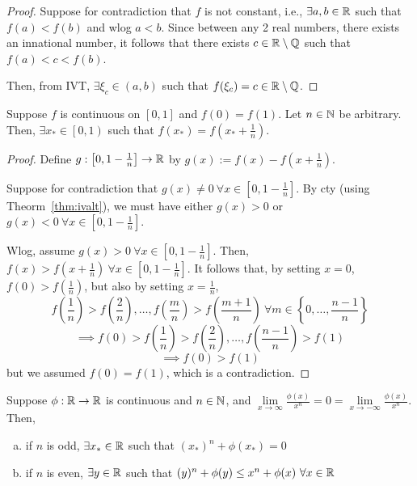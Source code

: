 \begin{proof}
    Suppose for contradiction that $f$ is not constant, i.e., $\exists a, b \in \mathbb R$ such that $f(a) < f(b)$ and wlog $a < b$.
    Since between any 2 real numbers, there exists an innational number, it follows that there exists $c \in \mathbb R \setminus \mathbb Q$ such that $f(a) < c < f(b)$.

    Then, from IVT, $\exists \xi_c \in (a, b)$ such that $f(\xi_c) = c \in \mathbb R \setminus \mathbb Q$.
\end{proof}

\begin{example}
    Suppose $f$ is continuous on $\left[0, 1\right]$ and $f(0) = f(1)$. Let $n \in \mathbb N$ be arbitrary.
    Then, $\exists x_* \in \left[0, 1\right)$ such that $f(x_*) = f\left(x_* + \frac{1}{n}\right)$. 
\end{example}

\begin{proof}
    Define $g: \left[0, 1 - \frac{1}{n}\right] \to \mathbb R$ by $g(x) := f(x) - f\left(x + \frac{1}{n}\right)$.

    Suppose for contradiction that $g(x) \neq 0\ \forall x \in \left[0, 1 - \frac{1}{n}\right]$.
    By cty (using Theorm~\ref{thm:ivalt}), we must have either $g(x) > 0$ or $g(x) < 0\ \forall x \in \left[0, 1 - \frac{1}{n}\right]$.

    Wlog, assume $g(x) > 0\ \forall x \in \left[0, 1 - \frac{1}{n}\right]$.
    Then, $f(x) > f\left(x + \frac{1}{n}\right)\ \forall x \in \left[0, 1 - \frac{1}{n}\right]$.
    It follows that, by setting $x=0$, $f(0) > f\left(\frac{1}{n}\right)$, but also by setting $x = \frac{1}{n}$,
    $$f\left(\frac{1}{n}\right) > f\left(\frac{2}{n}\right), \ldots, f\left(\frac{m}{n}\right) > f\left(\frac{m + 1}{n}\right)\ \forall m \in \left\{0, \ldots, \frac{n-1}{n}\right\}$$
    $$\implies f(0) > f\left(\frac{1}{n}\right) > f\left(\frac{2}{n}\right), \ldots, f\left(\frac{n-1}{n}\right) > f\left(1\right)$$
    $$\implies f(0) > f(1)$$
    but we assumed $f(0) = f(1)$, which is a contradiction.
\end{proof}

\begin{example}
    Suppose $\phi : \mathbb R \to \mathbb R$ is continuous and $n \in \mathbb N$, and $\lim\limits_{x \to \infty}\frac{\phi(x)}{x^n} = 0 = \lim\limits_{x \to -\infty}\frac{\phi(x)}{x^n}$.
    Then,
    \begin{enumerate}[(a)]
        \item if $n$ is odd, $\exists x_* \in \mathbb R$ such that $(x_*)^n + \phi(x_*) = 0$
        \item if $n$ is even, $\exists y \in \mathbb R$ such that $(y)^n + \phi(y) \leq x^n + \phi(x)\ \forall x \in \mathbb R$
    \end{enumerate}
\end{example}

